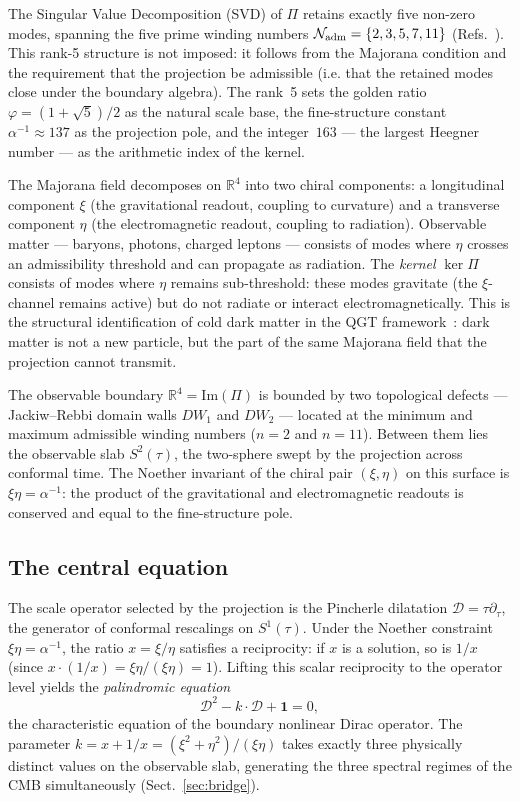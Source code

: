 \documentclass[twocolumn,10pt]{article}
\newcommand{\vp}{\varphi}
\newcommand{\kerPi}{\ker\Pi}
\begin{document}
The Singular Value Decomposition (SVD) of $\Pi$ retains exactly
five non-zero modes, spanning the five prime winding numbers
$\mathcal{N}_{\rm adm}=\{2,3,5,7,11\}$ (Refs.~\cite{CamP01,CamP02}).
This rank-5 structure is not imposed: it follows from the Majorana
condition and the requirement that the projection be admissible (i.e.
that the retained modes close under the boundary algebra). The rank~5
sets the golden ratio $\vp=(1+\sqrt{5})/2$ as the natural scale base,
the fine-structure constant $\alpha^{-1}\approx137$ as the projection
pole, and the integer~$163$ — the largest Heegner number — as the
arithmetic index of the kernel.

The Majorana field decomposes on $\mathbb{R}^4$ into two chiral
components: a longitudinal component $\xi$ (the gravitational
readout, coupling to curvature) and a transverse component $\eta$
(the electromagnetic readout, coupling to radiation). Observable
matter — baryons, photons, charged leptons — consists of modes where
$\eta$ crosses an admissibility threshold and can propagate as
radiation. The \emph{kernel} $\kerPi$ consists of modes where $\eta$
remains sub-threshold: these modes gravitate (the $\xi$-channel
remains active) but do not radiate or interact electromagnetically.
This is the structural identification of cold dark matter in the QGT
framework~\cite{CamP11}: dark matter is not a new particle, but the
part of the same Majorana field that the projection cannot transmit.

The observable boundary $\mathbb{R}^4=\mathrm{Im}(\Pi)$ is bounded
by two topological defects — Jackiw--Rebbi domain walls $DW_1$ and
$DW_2$ — located at the minimum and maximum admissible winding numbers
($n=2$ and $n=11$). Between them lies the observable slab $S^2(\tau)$,
the two-sphere swept by the projection across conformal time. The
Noether invariant of the chiral pair $(\xi,\eta)$ on this surface is
$\xi\eta = \alpha^{-1}$: the product of the gravitational and
electromagnetic readouts is conserved and equal to the fine-structure
pole.

\subsection*{The central equation}

The scale operator selected by the projection is the Pincherle
dilatation $\mathcal{D}=\tau\partial_\tau$, the generator of
conformal rescalings on $S^1(\tau)$. Under the Noether constraint
$\xi\eta=\alpha^{-1}$, the ratio $x=\xi/\eta$ satisfies a
reciprocity: if $x$ is a solution, so is $1/x$ (since
$x\cdot(1/x)=\xi\eta/(\xi\eta)=1$). Lifting this scalar reciprocity
to the operator level yields the \emph{palindromic equation}
\begin{equation}
  \mathcal{D}^2 - k\cdot\mathcal{D} + \mathbf{1} = 0,
  \label{eq:central}
\end{equation}
the characteristic equation of the boundary nonlinear Dirac operator.
The parameter $k = x+1/x = (\xi^2+\eta^2)/(\xi\eta)$ takes exactly
three physically distinct values on the observable slab, generating
the three spectral regimes of the CMB simultaneously
(Sect.~\ref{sec:bridge}).
\end{document}

